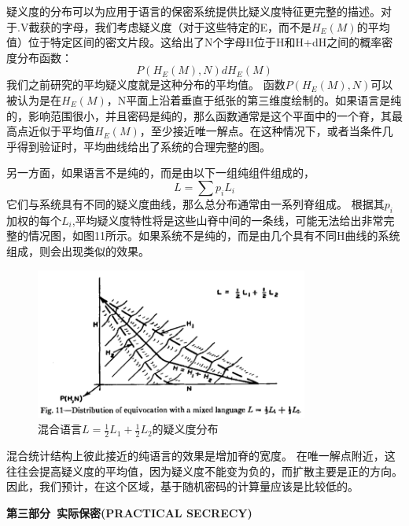 \documentclass[]{article}
\begin{document}
疑义度的分布可以为应用于语言的保密系统提供比疑义度特征更完整的描述。对于.V截获的字母，我们考虑疑义度（对于这些特定的E，而不是$H_E(M)$的平均值）位于特定区间的密文片段。这给出了N个字母H位于H和H+dH之间的概率密度分布函数：
\[P(H_E(M),N) dH_E(M)\]
我们之前研究的平均疑义度就是这种分布的平均值。
函数$P(H_E(M),N)$可以被认为是在$H_E(M)$，N平面上沿着垂直于纸张的第三维度绘制的。如果语言是纯的，影响范围很小，并且密码是纯的，那么函数通常是这个平面中的一个脊，其最高点近似于平均值$H_E(M)$，至少接近唯一解点。在这种情况下，或者当条件几乎得到验证时，平均曲线给出了系统的合理完整的图。

另一方面，如果语言不是纯的，而是由以下一组纯组件组成的，
\[L=\sum {p_i L_i}\]
它们与系统具有不同的疑义度曲线，那么总分布通常由一系列脊组成。
根据其$p_i$加权的每个$L_i$,平均疑义度特性将是这些山脊中间的一条线，可能无法给出非常完整的情况图，如图11所示。如果系统不是纯的，而是由几个具有不同H曲线的系统组成，则会出现类似的效果。

\begin{figure}[htbp]
	\centering
	\includegraphics[width=0.8\textwidth]{fig11.png}
	\caption{混合语言$L=\frac{1}{2}L_1 + \frac{1}{2}L_2$的疑义度分布}
	\label{fig:fig11}
\end{figure}

混合统计结构上彼此接近的纯语言的效果是增加脊的宽度。
在唯一解点附近，这往往会提高疑义度的平均值，因为疑义度不能变为负的，而扩散主要是正的方向。因此，我们预计，在这个区域，基于随机密码的计算量应该是比较低的。

\newpage
%   
%

\begin{center}
	\LARGE{\textbf{第三部分\ 实际保密(PRACTICAL SECRECY)}}
\end{center}
\end{document}
